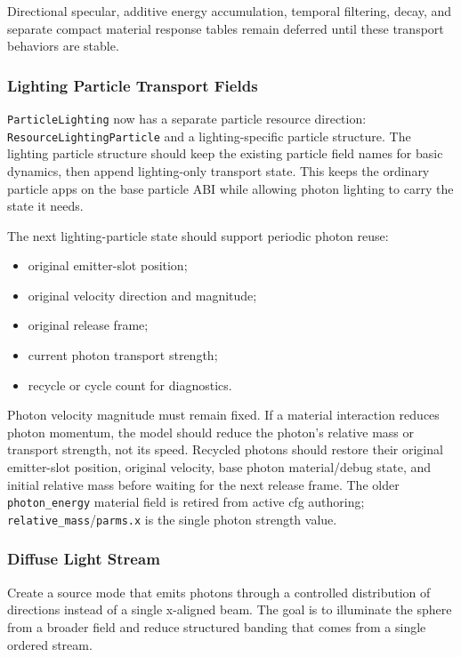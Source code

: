Directional specular, additive energy accumulation, temporal filtering, decay,
and separate compact material response tables remain deferred until these
transport behaviors are stable.

\subsubsection{Lighting Particle Transport Fields}

\texttt{ParticleLighting} now has a separate particle resource direction:
\texttt{ResourceLightingParticle} and a lighting-specific particle structure.
The lighting particle structure should keep the existing particle field names
for basic dynamics, then append lighting-only transport state.  This keeps the
ordinary particle apps on the base particle ABI while allowing photon lighting
to carry the state it needs.

The next lighting-particle state should support periodic photon reuse:
\begin{itemize}
    \item original emitter-slot position;
    \item original velocity direction and magnitude;
    \item original release frame;
    \item current photon transport strength;
    \item recycle or cycle count for diagnostics.
\end{itemize}

Photon velocity magnitude must remain fixed.  If a material interaction reduces
photon momentum, the model should reduce the photon's relative mass or
transport strength, not its speed.  Recycled photons should restore their
original emitter-slot position, original velocity, base photon material/debug
state, and initial relative mass before waiting for the next release frame.
The older \texttt{photon\_energy} material field is retired from active
cfg authoring; \texttt{relative\_mass}/\texttt{parms.x} is the single photon
strength value.

\subsubsection{Diffuse Light Stream}

Create a source mode that emits photons through a controlled distribution of
directions instead of a single x-aligned beam.  The goal is to illuminate the
sphere from a broader field and reduce structured banding that comes from a
single ordered stream.

